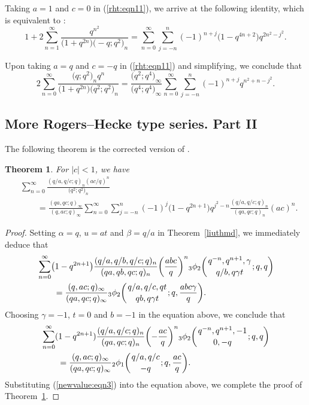 \documentclass[pdftex]{sigma}
\numberwithin{equation}{section}
\newtheorem{Theorem}{Theorem}[section]
\begin{document}
Taking $a=1$ and $c=0$ in (\ref{rht:eqn11}), we arrive at the following identity, which is equivalent to \cite[equation~(2.6)]{WangChern2019}:
\begin{equation*}%
1+2\sum_{n=1}^\infty \frac{q^{n^2}}{\bigl(1+q^{2n}\bigr)\bigl(-q; q^2\bigr)_n}
=\sum_{n=0}^\infty \sum_{j=-n}^n (-1)^{n+j} \bigl(1-q^{4n+2}\bigr) q^{2n^2-j^2}.
\end{equation*}

Upon taking $a=q$ and $c=-q$ in (\ref{rht:eqn11}) and simplifying, we conclude that
\begin{equation*}%
2\sum_{n=0}^\infty \frac{\bigl(q; q^2\bigr)_n q^n}{\bigl(1+q^{2n}\bigr)\bigl(q^2; q^2\bigr)_n}
=\frac{\bigl(q^2; q^4\bigr)_\infty}{\bigl(q^4; q^4\bigr)_\infty}
\sum_{n=0}^\infty \sum_{j=-n}^n (-1)^{n+j} q^{n^2+n-j^2}.
\end{equation*}	

\subsection{More Rogers--Hecke type series. Part II}
 The following theorem is the corrected version of \cite[Theorem~4.10]{Liu2013IJTN}.
\begin{Theorem}\label{eulerthm} For $|c|<1$, we have
	\begin{align}
		&\sum_{n=0}^\infty \frac{(q/a, q/c; q)_n (ac/q)^n}{\bigl(q^2; q^2\bigr)_n}\nonumber\\
		&\qquad{}=\frac{(qa, qc; q)_\infty} {(q, ac; q)_\infty}
		\sum_{n=0}^\infty \sum_{j=-n}^n (-1)^j \bigl(1-q^{2n+1}\bigr) q^{j^2-n}
		\frac{(q/a, q/c; q)_n}{(qa, qc; q)_n}(ac)^n.\label{euler:eqn1}
	\end{align}	
\end{Theorem}
\begin{proof}
Setting $\alpha=q$, $u=at$ and $\beta=q/a$ in Theorem~\ref{liuthmd}, we immediately deduce that
\begin{align*}%
	&\sum_{n=0}^\infty\bigl(1-q^{2n+1}\bigr) \frac{(q/a, q/b, q/c; q)_n}{(qa, qb, qc; q)_n} \biggl(\frac{abc}{q}\biggr)^n {_3\phi_2}\biggl({{q^{-n}, q^{n+1}, \gamma}\atop{q/b, q\gamma t}}; q, q\biggr)\\
	&\qquad{}=\frac{(q, ac; q)_\infty}{(qa, qc; q)_\infty}
	{_3\phi_2}\biggl({{q/a, q/c, qt}\atop{qb, q\gamma t}}; q, \frac{abc\gamma}{q}\biggr).\nonumber
\end{align*}	
Choosing $\gamma=-1$, $t=0$ and $b=-1$ in the equation above, we conclude that
\begin{align*}
	&\sum_{n=0}^\infty (1-q^{2n+1})\frac{(q/a, q/c; q)_n}{(qa, qc; q)_n}\biggl(-\frac{ ac}{q}\biggr)^n {_3\phi_2}\biggl({{q^{-n}, q^{n+1}, -1}\atop{0, -q}}; q, q\biggr)\nonumber\\
	&\qquad{}=\frac{(q, ac; q)_\infty}{(qa, qc; q)_\infty} {_2\phi_1} \biggl({{q/a, q/c}\atop{-q}}; q, \frac{ac}{q} \biggr).%
\end{align*}
Substituting (\ref{newvalue:eqn3}) into the equation above, we complete the proof of Theorem~\ref{eulerthm}.
\end{proof}
\end{document}
